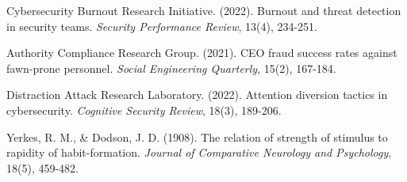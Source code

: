 \documentclass[11pt,a4paper]{article}
\begin{document}
\begin{thebibliography}{99}
Cybersecurity Burnout Research Initiative. (2022). Burnout and threat detection in security teams. \textit{Security Performance Review}, 13(4), 234-251.

Authority Compliance Research Group. (2021). CEO fraud success rates against fawn-prone personnel. \textit{Social Engineering Quarterly}, 15(2), 167-184.

Distraction Attack Research Laboratory. (2022). Attention diversion tactics in cybersecurity. \textit{Cognitive Security Review}, 18(3), 189-206.

Yerkes, R. M., \& Dodson, J. D. (1908). The relation of strength of stimulus to rapidity of habit-formation. \textit{Journal of Comparative Neurology and Psychology}, 18(5), 459-482.

\end{thebibliography}
\end{document}
